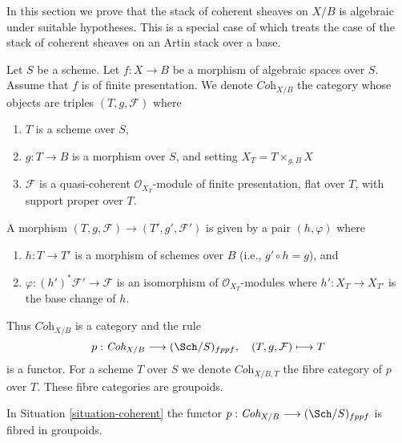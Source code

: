 \noindent
In this section we prove that the stack of coherent sheaves 
on $X/B$ is algebraic under suitable hypotheses. This is a
special case of \cite[Theorem 2.1.1]{lieblich_remarks}
which treats the case of the stack of coherent sheaves on an
Artin stack over a base.

\begin{situation}
\label{situation-coherent}
Let $S$ be a scheme. Let $f : X \to B$ be a morphism of algebraic spaces
over $S$. Assume that $f$ is of finite presentation.
We denote $\textit{Coh}_{X/B}$ the category whose objects are
triples $(T, g, \mathcal{F})$ where
\begin{enumerate}
\item $T$ is a scheme over $S$,
\item $g : T \to B$ is a morphism over $S$, and setting
$X_T = T \times_{g, B} X$
\item $\mathcal{F}$ is a quasi-coherent $\mathcal{O}_{X_T}$-module
of finite presentation, flat over $T$, with support proper over $T$.
\end{enumerate}
A morphism $(T, g, \mathcal{F}) \to (T', g', \mathcal{F}')$
is given by a pair $(h, \varphi)$ where
\begin{enumerate}
\item $h : T \to T'$ is a morphism of schemes over $B$
(i.e., $g' \circ h = g$), and
\item $\varphi : (h')^*\mathcal{F}' \to \mathcal{F}$ is an
isomorphism of $\mathcal{O}_{X_T}$-modules where $h' : X_T \to X_{T'}$
is the base change of $h$.
\end{enumerate}
\end{situation}

\noindent
Thus $\textit{Coh}_{X/B}$ is a category and the rule
$$
p : \textit{Coh}_{X/B} \longrightarrow (\Sch/S)_{fppf},
\quad
(T, g, \mathcal{F}) \longmapsto T
$$
is a functor. For a scheme $T$ over $S$ we denote $\textit{Coh}_{X/B, T}$
the fibre category of $p$ over $T$. These fibre categories are groupoids.

\begin{lemma}
\label{lemma-coherent-fibred-in-groupoids}
In Situation \ref{situation-coherent} the functor
$p : \textit{Coh}_{X/B} \longrightarrow (\Sch/S)_{fppf}$
is fibred in groupoids.
\end{lemma}

